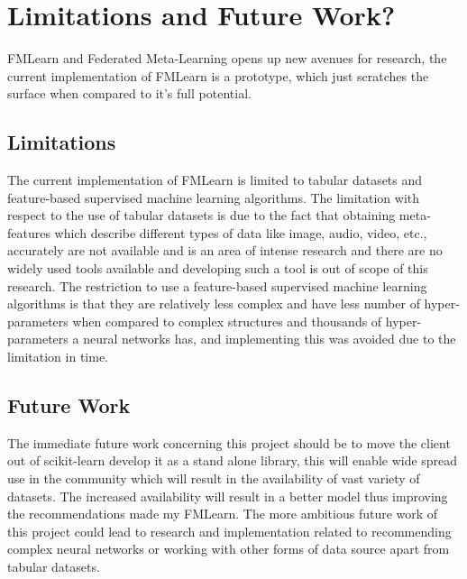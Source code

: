 \chapter{Limitations and Future Work?}

FMLearn and Federated Meta-Learning opens up new avenues for research, the current implementation of FMLearn is a prototype, which just scratches the surface when compared to it's full potential.

\section*{Limitations}

The current implementation of FMLearn is limited to tabular datasets and feature‐based supervised machine learning algorithms. The limitation with respect to the use of tabular datasets is due to the fact that obtaining meta-features which describe different types of data like image, audio, video, etc., accurately are not available and is an area of intense research \citep{image-meta-data} \citep{image-meta-data-2} and there are no widely used tools available and developing such a tool is out of scope of this research. The restriction to use a feature-based supervised machine learning algorithms is that they are relatively less complex and have less number of hyper-parameters when compared to complex structures and thousands of hyper-parameters a neural networks has, and implementing this was avoided due to the limitation in time.

\section*{Future Work}

The immediate future work concerning this project should be to move the client out of scikit-learn develop it as a stand alone library, this will enable wide spread use in the community which will result in the availability of vast variety of datasets. The increased availability will result in a better model thus improving the recommendations made my FMLearn. The more ambitious future work of this project could lead to research and implementation related to recommending complex neural networks or working with other forms of data source apart from tabular datasets.